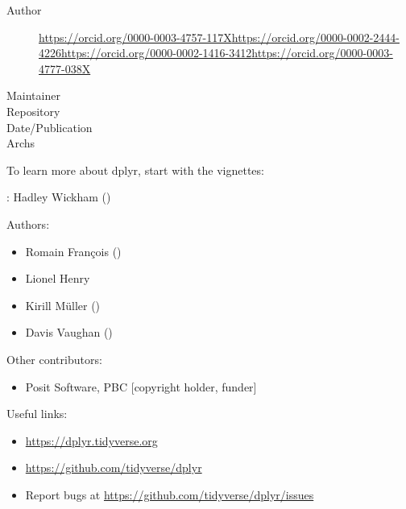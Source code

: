 \documentclass[a4paper]{book}
\begin{document}
\begin{description}
\item[Author]\url{https://orcid.org/0000-0003-4757-117X}\url{https://orcid.org/0000-0002-2444-4226}\url{https://orcid.org/0000-0002-1416-3412}\url{https://orcid.org/0000-0003-4777-038X}
\item[Maintainer]\AsIs{}
\item[Repository]
\item[Date/Publication]
\item[Archs]
\end{description}
%
\begin{Description}
To learn more about dplyr, start with the vignettes:
\end{Description}
%
\begin{Author}
: Hadley Wickham  ()

Authors:
\begin{itemize}

\item{} Romain François ()
\item{} Lionel Henry
\item{} Kirill Müller ()
\item{} Davis Vaughan  ()

\end{itemize}


Other contributors:
\begin{itemize}

\item{} Posit Software, PBC [copyright holder, funder]

\end{itemize}


\end{Author}
%
\begin{SeeAlso}
Useful links:
\begin{itemize}

\item{} \url{https://dplyr.tidyverse.org}
\item{} \url{https://github.com/tidyverse/dplyr}
\item{} Report bugs at \url{https://github.com/tidyverse/dplyr/issues}

\end{itemize}


\end{SeeAlso}
\end{document}
